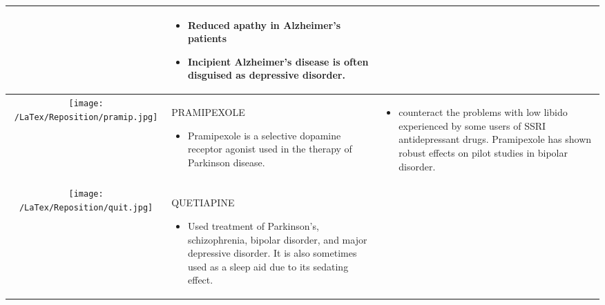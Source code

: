 \documentclass[preprint,11pt]{elsarticle}
\begin{document}
\begin{table}[h!]
\begin{tabular}{ | c | m{4.5cm} | m{4.5cm} | }
\begin{itemize}
      \end{itemize}
    & 
      \begin{itemize}
        \item Reduced apathy in Alzheimer's patients 
        \item Incipient Alzheimer's disease is often disguised as depressive disorder.
            \end{itemize}
    \\ \hline
    
     \begin{minipage}{.3\textwidth}
      \texttt{[image: /LaTex/Reposition/pramip.jpg]}
    \end{minipage}
    & PRAMIPEXOLE
      \begin{itemize}
        \item Pramipexole is a selective dopamine receptor agonist used in the therapy of Parkinson disease. 
         
      \end{itemize}
    & 
      \begin{itemize}
        \item counteract the problems with low libido experienced by some users of SSRI antidepressant drugs. Pramipexole has shown robust effects on pilot studies in bipolar disorder.
            \end{itemize}
    \\ \hline
     \begin{minipage}{.3\textwidth}
      \texttt{[image: /LaTex/Reposition/quit.jpg]}
    \end{minipage}
    & QUETIAPINE
      \begin{itemize}
        \item Used treatment of Parkinson's, schizophrenia, bipolar disorder, and major depressive disorder. It is also sometimes used as a sleep aid due to its sedating effect. 
       

\end{itemize}
\end{tabular}
\end{table}
\end{document}
